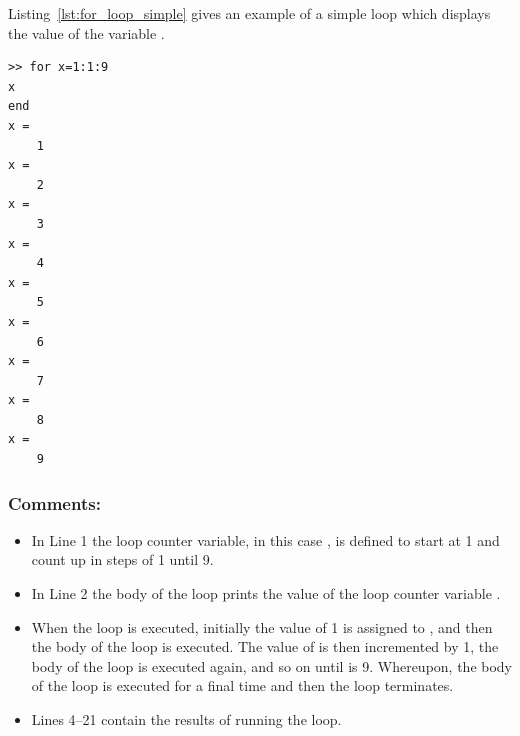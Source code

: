 Listing~\ref{lst:for_loop_simple} gives an example of a simple  loop which displays the value of the variable .
\begin{lstlisting}[caption={Simple example of a \mcode{for} loop},label=lst:for_loop_simple]
>> for x=1:1:9
x
end
x =
    1
x =
    2
x =
    3
x =
    4
x =
    5
x =
    6
x =
    7
x =
    8
x =
    9  
\end{lstlisting}

\subsubsection{Comments:}
\begin{itemize}
\item In Line 1 the loop counter variable, in this case , is defined to start at 1 and count up in steps of 1 until 9.
\item In Line 2 the body of the loop prints the value of the loop counter variable .
\item When the loop is executed, initially the value of 1 is assigned to , and then the body of the loop is executed. The value of  is then incremented by 1, the body of the loop is executed again, and so on until  is 9. Whereupon, the body of the loop is executed for a final time and then the loop terminates.
\item Lines 4--21 contain the results of running the  loop.
\end{itemize}

